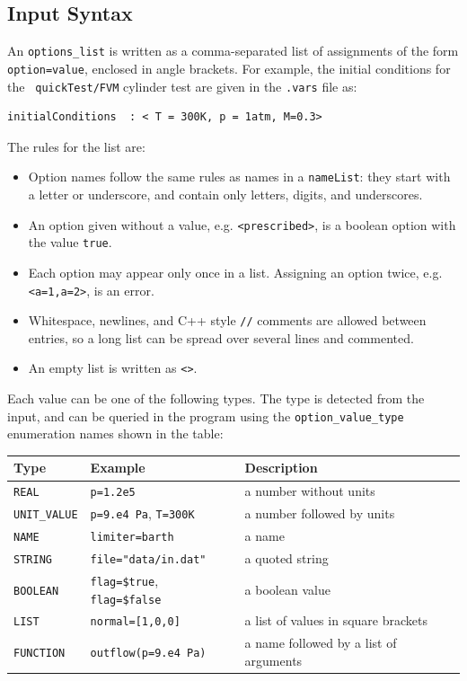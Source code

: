 \subsection {Input Syntax}
%
An {\tt options\_list} is written as a comma-separated list of
assignments of the form \verb|option=value|, enclosed in angle
brackets.  For example, the initial conditions for the {\tt
  quickTest/FVM} cylinder test are given in the {\tt .vars} file as:
\begin{verbatim}
initialConditions  : < T = 300K, p = 1atm, M=0.3>
\end{verbatim}
The rules for the list are:
\begin{itemize}
\item Option names follow the same rules as names in a {\tt nameList}:
  they start with a letter or underscore, and contain only letters,
  digits, and underscores.
\item An option given without a value, e.g. \verb|<prescribed>|, is a
  boolean option with the value {\tt true}.
\item Each option may appear only once in a list.  Assigning an option
  twice, e.g. \verb|<a=1,a=2>|, is an error.
\item Whitespace, newlines, and C++ style \verb|//| comments are
  allowed between entries, so a long list can be spread over several
  lines and commented.
\item An empty list is written as \verb|<>|.
\end{itemize}
%
Each value can be one of the following types.  The type is detected
from the input, and can be queried in the program using the
{\tt option\_value\_type} enumeration names shown in the table:
\begin{center}
\begin{tabular}{|l|l|l|} \hline
Type & Example & Description \\ \hline \hline
{\tt REAL} & \verb|p=1.2e5| & a number without units \\ \hline
{\tt UNIT\_VALUE} & \verb|p=9.e4 Pa|, \verb|T=300K| & a number followed
by units \\ \hline
{\tt NAME} & \verb|limiter=barth| & a name \\ \hline
{\tt STRING} & \verb|file="data/in.dat"| & a quoted string \\ \hline
{\tt BOOLEAN} & \verb|flag=$true|, \verb|flag=$false| & a boolean value \\ \hline
{\tt LIST} & \verb|normal=[1,0,0]| & a list of values in square
brackets \\ \hline
{\tt FUNCTION} & \verb|outflow(p=9.e4 Pa)| & a name followed by a list
of arguments \\ \hline
\end{tabular}
\end{center}
